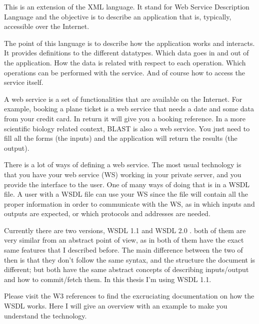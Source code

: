 \documentclass[a4paper,10pt]{article}
\begin{document}
  This is an extension of the XML language. It stand for Web Service Description Language and the objective is to describe an application that is, typically, accessible over the Internet.\vspace{3 mm}

  The point of this language is to describe how the application works and interacts. It provides definitions to the different datatypes. Which data goes in and out of the application. How the data is related with respect to each operation. Which operations can be performed with the service. And of course how to access the service itself.\vspace{3 mm}

  A web service is a set of functionalities that are available on the Internet. For example, booking a plane ticket is a web service that needs a date and some data from your credit card. In return it will give you a booking reference. In a more scientific biology related context, BLAST is also a web service. You just need to fill all the forms (the inputs) and the application will return the results (the output).\vspace{3 mm}

  There is a lot of ways of defining a web service. The most usual technology is that you have your web service (WS) working in your private server, and you provide the interface to the user. One of many ways of doing that is in a WSDL file. A user with a WSDL file can use your WS since the file will contain all the proper information in order to communicate with the WS, as in which inputs and outputs are expected, or which protocols and addresses are needed.\vspace{3 mm}

  Currently there are two versions,  WSDL 1.1 \cite{wsdl} and WSDL 2.0 \cite{wsdl2}. both of them are very similar from an abstract point of view, as in both of them have the exact same features that I described before. The main difference between the two of then is that they don't follow the same syntax, and the structure the document is different; but both have the same abstract concepts of describing inputs/output and how to commit/fetch them. In this thesis I'm using WSDL 1.1.\vspace{3 mm}

  Please visit the W3 references to find the excruciating documentation on how the WSDL works. Here I will give an overview with an example to make you understand the technology.\vspace{3 mm}
\end{document}
